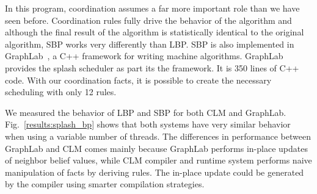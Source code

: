 \begin{dblfig}
   \begin{center}
   \end{center}
\end{dblfig}

In this program, coordination assumes a far more important role than
we have seen before. Coordination rules fully drive the behavior of
the algorithm and although the final result of the algorithm is
statistically identical to the original algorithm, SBP works very
differently than LBP.  SBP is also implemented in
GraphLab~\cite{GraphLab2010}, a C++ framework for writing machine
algorithms.  GraphLab provides the splash scheduler as part its the
framework. It is 350 lines of C++ code.  With our coordination facts,
it is possible to create the necessary scheduling with only 12 rules.

We measured the behavior of LBP and SBP for both CLM and GraphLab.
Fig.~\ref{results:splash_bp} shows that both systems have very similar behavior
when using a variable number of threads.  The differences in performance between
GraphLab and CLM comes mainly because GraphLab performs in-place updates of
neighbor belief values, while CLM compiler and runtime system performs naive
manipulation of facts by deriving rules. The in-place update could be generated
by the compiler using smarter compilation strategies.
